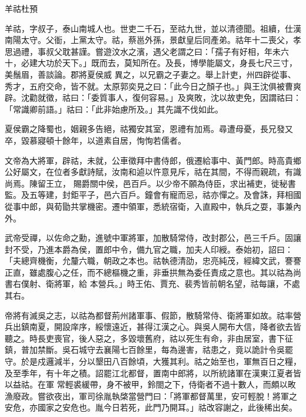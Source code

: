 
\begin{pinyinscope}
羊祜杜預



 羊祜，字叔子，泰山南城人也。世吏二千石，至祜九世，並以清德聞。祖續，仕漢南陽太守。父衜，上黨太守。祜，蔡邕外孫，景獻皇后同產弟。祜年十二喪父，孝思過禮，事叔父耽甚謹。嘗遊汶水之濱，遇父老謂之曰：「孺子有好相，年未六十，必建大功於天下。」既而去，莫知所在。及長，博學能屬文，身長七尺三寸，美鬚眉，善談論。郡將夏侯威
 異之，以兄霸之子妻之。舉上計吏，州四辟從事、秀才，五府交命，皆不就。太原郭奕見之曰：「此今日之顏子也。」與王沈俱被曹爽辟。沈勸就徵，祜曰：「委質事人，復何容易。」及爽敗，沈以故吏免，因謂祜曰：「常識卿前語。」祜曰：「此非始慮所及。」其先識不伐如此。



 夏侯霸之降蜀也，姻親多告絕，祜獨安其室，恩禮有加焉。尋遭母憂，長兄發又卒，毀慕寢頓十餘年，以道素自居，恂恂若儒者。



 文帝為大將軍，辟祜，未就，公車徵拜中書侍郎，俄遷給事中、黃門郎。時高貴鄉公好屬文，在位者多獻詩賦，汝南和逌以忤意見斥，祜在其間，不得而親疏，有識尚焉。陳留王立，
 賜爵關中侯，邑百戶。以少帝不願為侍臣，求出補吏，徙秘書監。及五等建，封鉅平子，邑六百戶。鐘會有寵而忌，祜亦憚之。及會誅，拜相國從事中郎，與荀勖共掌機密。遷中領軍，悉統宿衛，入直殿中，執兵之耍，事兼內外。



 武帝受禪，以佐命之勳，進號中軍將軍，加散騎常侍，改封郡公，邑三千戶。固讓封不受，乃進本爵為侯，置郎中令，備九官之職，加夫人印綬。泰始初，詔曰：「夫總齊機衡，允釐六職，朝政之本也。祜執德清劭，忠亮純茂，經緯文武，謇謇正直，雖處腹心之任，而不總樞機之重，非垂拱無為委任責成之意也。其以祜為尚書右僕射、衛將軍，給
 本營兵。」時王佑、賈充、裴秀皆前朝名望，祜每讓，不處其右。



 帝將有滅吳之志，以祜為都督荊州諸軍事、假節，散騎常侍、衛將軍如故。祜率營兵出鎮南夏，開設庠序，綏懷遠近，甚得江漢之心。與吳人開布大信，降者欲去皆聽之。時長吏喪官，後人惡之，多毀壞舊府，祜以死生有命，非由居室，書下征鎮，普加禁斷。吳石城守去襄陽七百餘里，每為邊害，祜患之，竟以詭計令吳罷守。於是戍邏減半，分以墾田八百餘頃，大獲其利。祜之始至也，軍無百日之糧，及至季年，有十年之積。詔罷江北都督，置南中郎將，以所統諸軍在漢東江夏者皆以益祜。在軍
 常輕裘緩帶，身不被甲，鈴閤之下，侍衛者不過十數人，而頗以畋漁廢政。嘗欲夜出，軍司徐胤執棨當營門曰：「將軍都督萬里，安可輕脫！將軍之安危，亦國家之安危也。胤今日若死，此門乃開耳。」祜改容謝之，此後稀出矣。




\end{pinyinscope}
